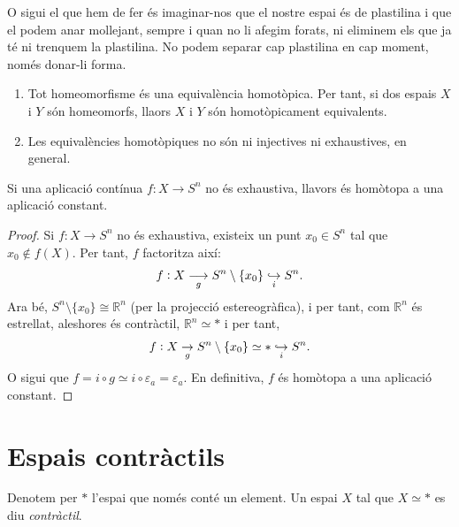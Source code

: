 \documentclass[../main.tex]{subfiles}
\begin{document}
O sigui el que hem de fer és imaginar-nos que el nostre espai és de plastilina i que el podem anar mollejant, sempre i quan no li afegim forats, ni eliminem els que ja té ni trenquem la plastilina. No podem separar cap plastilina en cap moment, només donar-li forma.


\begin{prop}
\label{prop:propietatsequivalenciahomotopica}
\begin{enumerate}[(1)]
    \item Tot homeomorfisme és una equivalència homotòpica. Per tant, si dos espais $X$ i $Y$ són homeomorfs, llaors $X$ i $Y$ són homotòpicament equivalents.
    \item Les equivalències homotòpiques no són ni injectives ni exhaustives, en general.
\end{enumerate}
\end{prop}

\begin{prop}
[Exercici 11]\label{prop:aplicacionoexhaustivahomotopa}\label{exercici1.11} Si una aplicació contínua $f:X\rightarrow S^n$ no és exhaustiva, llavors és homòtopa a una aplicació constant.
\end{prop}
\begin{proof}
Si $f:X\rightarrow S^n$ no és exhaustiva, existeix un punt $x_0\in S^n$ tal que $x_0\not\in f(X)$. Per tant, $f$ factoritza així:
\begin{equation}
    \notag
    f:X\underset{g}{\longrightarrow} S^n\setminus \{x_0\}\underset{i}{\hookrightarrow} S^n.
\end{equation}
Ara bé, $S^n\setminus\{x_0\}\cong \mathbb{R}^n$ (per la projecció estereogràfica), i per tant, com $\mathbb{R}^n$ és estrellat, aleshores és contràctil, $\mathbb{R}^n\simeq *$ i per tant,
\begin{equation}
    \notag
    f:X\underset{g}{\rightarrow}S^n\setminus\{x_0\}\simeq *\underset{i}{\hookrightarrow}S^n.
\end{equation}
O sigui que $f=i\circ g\simeq i\circ\varepsilon_a=\varepsilon_a$.
En definitiva, $f$ és homòtopa a una aplicació constant.
\end{proof}


\section{Espais contràctils}

\begin{defi}
[Contràctil]\label{def:contractil} Denotem per $*$ l'espai que només conté un element. Un espai $X$ tal que $X\simeq *$ es diu \textit{contràctil}.
\end{defi}
\end{document}
